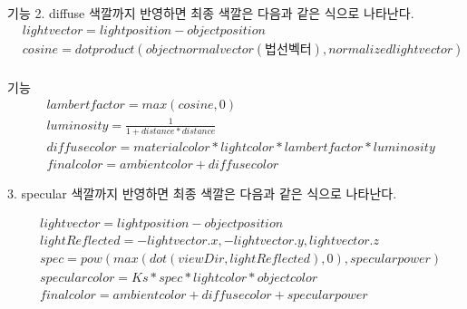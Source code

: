 \documentclass[a0paper,portrait]{baposter}
\begin{document}
\begin{poster}
\begin{posterbox}[name=install,column=0,below=lists]{기능}
2. diffuse 색깔까지 반영하면 최종 색깔은 다음과 같은 식으로 나타난다.
\begin{equation*}
	\begin{split}
		&light vector=light position-object position \\
		&cosine=dot product(object normal vector(법선벡터),normalized light vector) \\
	\end{split}
\end{equation*}

\end{posterbox}

\begin{posterbox}[name=equation,column=1,below=intro]{기능}
\begin{equation*}
	\begin{split}
		&lambert factor=max(cosine,0) \\
		&luminosity=\frac{1}{1+distance*distance} \\
		&diffuse color=material color*light color*lambert factor* luminosity \\
		&final color=ambient color+diffuse color
	\end{split}
\end{equation*}

3. specular 색깔까지 반영하면 최종 색깔은 다음과 같은 식으로 나타난다.

\begin{equation*}
	\begin{split}
		&light vector=light position-object position \\
		&lightReflected = {-light vector.x,-light vector.y,light vector.z} \\
		&spec = pow(max(dot(viewDir,lightReflected),0),specularpower) \\
		&specular color=Ks * spec * light color * object color \\
		&final color=ambient color+diffuse color + specular power
	\end{split}
\end{equation*}


\end{posterbox}
\end{poster}
\end{document}
